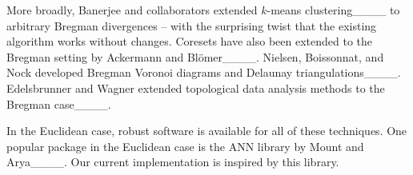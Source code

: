 More broadly, Banerjee and collaborators extended $k$-means clustering____ to arbitrary Bregman divergences -- with the surprising twist that the existing algorithm works without changes. Coresets have also been extended to the Bregman setting by Ackermann and Bl{\"o}mer____. Nielsen, Boissonnat, and Nock developed Bregman Voronoi diagrams and Delaunay triangulations____. Edelsbrunner and Wagner extended topological data analysis methods to the Bregman case____. 


In the Euclidean case, robust software is available for all of these techniques.
One popular package in the Euclidean case is the ANN library by Mount and Arya____. Our current implementation is inspired by this library. %